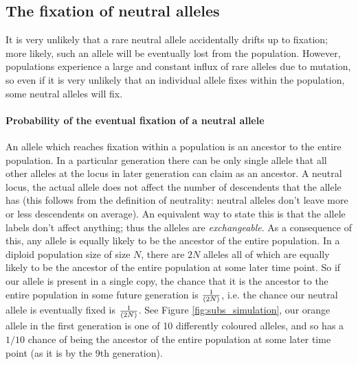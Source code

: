 \subsection{The fixation of neutral alleles} It is very unlikely that a rare
neutral allele accidentally drifts up to fixation; more likely, such an allele
will be eventually lost from the population. However, populations experience a
large and constant influx of rare alleles due to mutation, so even if it is
very unlikely that an individual allele fixes within the population, some
neutral alleles will fix.  \\




\paragraph{Probability of the eventual fixation of a neutral allele}
An allele which reaches fixation within a population is an ancestor to the
entire population. In a particular generation there can be only single allele
that all other alleles at the locus in later generation can claim as an
ancestor. A neutral locus, the actual allele does not affect the number of
descendents that the allele has (this follows from the definition of
neutrality: neutral alleles don't leave more or less descendents on average).
An equivalent way to state this is that the allele labels don't affect
anything; thus the alleles are \emph{exchangeable}. As a consequence of this,
any allele is equally likely to be the ancestor of the entire population.  In a
diploid population size of size $N$, there are $2N$ alleles all of which are
equally likely to be the ancestor of the entire population at some later time
point. So if our allele is present in a single copy, the chance that it is the
ancestor to the entire population in some future generation is
$\nicefrac{1}{(2N)}$, i.e. the chance our neutral allele is eventually fixed is
$\nicefrac{1}{(2N)}$.  See Figure \ref{fig:subs_simulation}, our orange allele
in the first generation is one of 10 differently coloured alleles, and so has a
$1/10$ chance of being the ancestor of the entire population at some later time
point (as it is by the 9th generation).\\

